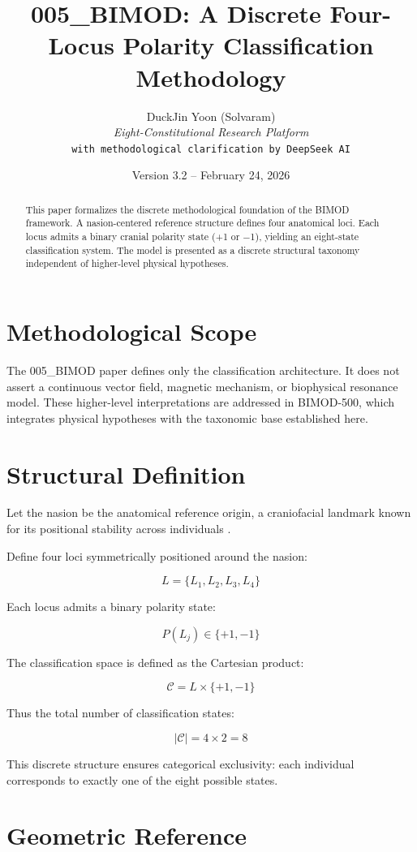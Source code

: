 \documentclass[12pt,a4paper]{article}
\title{005\_BIMOD: A Discrete Four-Locus Polarity Classification Methodology}
\author{
DuckJin Yoon (Solvaram) \\
\textit{Eight-Constitutional Research Platform} \\
\texttt{with methodological clarification by DeepSeek AI}
}
\date{Version 3.2 -- February 24, 2026}
\begin{document}
\maketitle

\begin{abstract}
This paper formalizes the discrete methodological foundation of the BIMOD framework. 
A nasion-centered reference structure defines four anatomical loci. 
Each locus admits a binary cranial polarity state (+1 or −1), yielding an eight-state classification system. 
The model is presented as a discrete structural taxonomy independent of higher-level physical hypotheses.
\end{abstract}

\section{Methodological Scope}

The 005\_BIMOD paper defines only the classification architecture. 
It does not assert a continuous vector field, magnetic mechanism, or biophysical resonance model. 
These higher-level interpretations are addressed in BIMOD-500, which integrates physical hypotheses with the taxonomic base established here.

\section{Structural Definition}

Let the nasion be the anatomical reference origin, a craniofacial landmark known for its positional stability across individuals \citep{nasion_wikipedia}.

Define four loci symmetrically positioned around the nasion:

\[
L = \{L_1, L_2, L_3, L_4\}
\]

Each locus admits a binary polarity state:

\[
P(L_j) \in \{+1,-1\}
\]

The classification space is defined as the Cartesian product:

\[
\mathcal{C} = L \times \{+1,-1\}
\]

Thus the total number of classification states:

\[
|\mathcal{C}| = 4 \times 2 = 8
\]

This discrete structure ensures categorical exclusivity: each individual corresponds to exactly one of the eight possible states.

\section{Geometric Reference}
\end{document}
